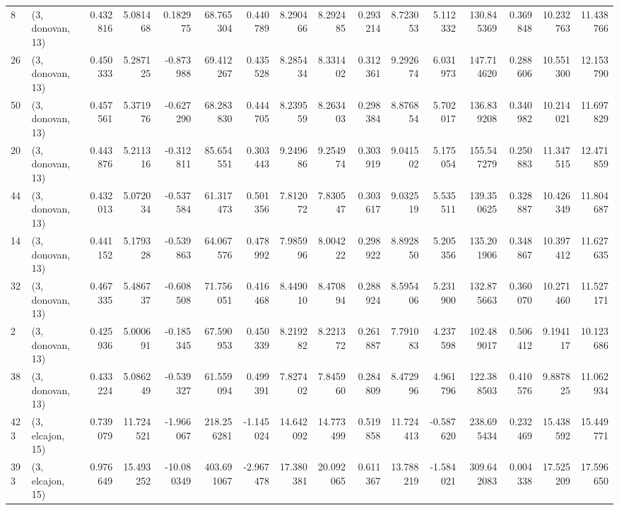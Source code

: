\begin{tabular}{llrrrrrrrrrrrrrr}
8   &  (3, donovan, 13) &   0.432816 &   5.081468 &   0.182975 &    68.765304 &   0.440789 &   8.290466 &   8.292485 &  0.293214 &   8.723053 &   5.112332 &   130.845369 &   0.369848 &  10.232763 &  11.438766 \\
26  &  (3, donovan, 13) &   0.450333 &   5.287125 &  -0.873988 &    69.412267 &   0.435528 &   8.285434 &   8.331402 &  0.312361 &   9.292674 &   6.031973 &   147.714620 &   0.288606 &  10.551300 &  12.153790 \\
50  &  (3, donovan, 13) &   0.457561 &   5.371976 &  -0.627290 &    68.283830 &   0.444705 &   8.239559 &   8.263403 &  0.298384 &   8.876854 &   5.702017 &   136.839208 &   0.340982 &  10.214021 &  11.697829 \\
20  &  (3, donovan, 13) &   0.443876 &   5.211316 &  -0.312811 &    85.654551 &   0.303443 &   9.249686 &   9.254974 &  0.303919 &   9.041502 &   5.175054 &   155.547279 &   0.250883 &  11.347515 &  12.471859 \\
44  &  (3, donovan, 13) &   0.432013 &   5.072034 &  -0.537584 &    61.317473 &   0.501356 &   7.812072 &   7.830547 &  0.303617 &   9.032519 &   5.535511 &   139.350625 &   0.328887 &  10.426349 &  11.804687 \\
14  &  (3, donovan, 13) &   0.441152 &   5.179328 &  -0.539863 &    64.067576 &   0.478992 &   7.985996 &   8.004222 &  0.298922 &   8.892850 &   5.205356 &   135.201906 &   0.348867 &  10.397412 &  11.627635 \\
32  &  (3, donovan, 13) &   0.467335 &   5.486737 &  -0.608508 &    71.756051 &   0.416468 &   8.449010 &   8.470894 &  0.288924 &   8.595406 &   5.231900 &   132.875663 &   0.360070 &  10.271460 &  11.527171 \\
2   &  (3, donovan, 13) &   0.425936 &   5.000691 &  -0.185345 &    67.590953 &   0.450339 &   8.219282 &   8.221372 &  0.261887 &   7.791083 &   4.237598 &   102.489017 &   0.506412 &   9.194117 &  10.123686 \\
38  &  (3, donovan, 13) &   0.433224 &   5.086249 &  -0.539327 &    61.559094 &   0.499391 &   7.827402 &   7.845960 &  0.284809 &   8.472996 &   4.961796 &   122.388503 &   0.410576 &   9.887825 &  11.062934 \\
423 &  (3, elcajon, 15) &   0.739079 &  11.724521 &  -1.966067 &   218.256281 &  -1.145024 &  14.642092 &  14.773499 &  0.519858 &  11.724413 &  -0.587620 &   238.695434 &   0.232469 &  15.438592 &  15.449771 \\
393 &  (3, elcajon, 15) &   0.976649 &  15.493252 & -10.080349 &   403.691067 &  -2.967478 &  17.380381 &  20.092065 &  0.611367 &  13.788219 &  -1.584021 &   309.642083 &   0.004338 &  17.525209 &  17.596650 \\

\end{tabular}
